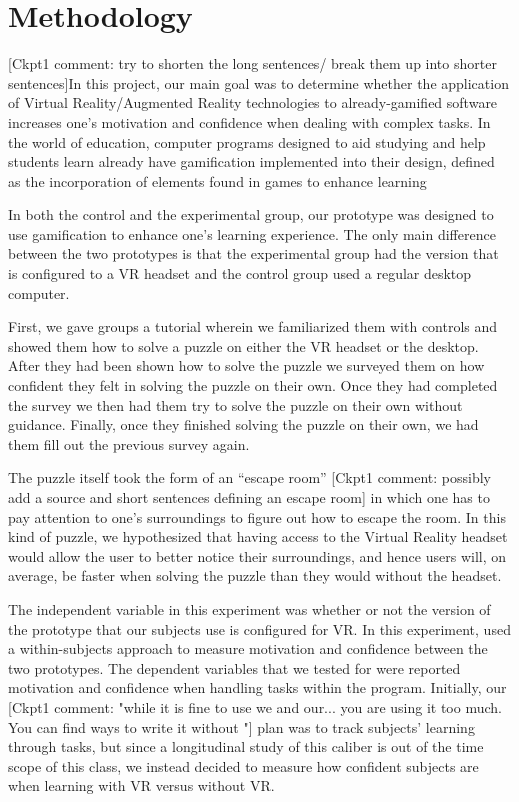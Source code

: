 \documentclass[manuscript,screen,review]{acmart}
\begin{document}
\section{Methodology}
[Ckpt1 comment: try to shorten the long sentences/ break them up into shorter sentences]In this project, our main goal was to determine whether the application of Virtual Reality/Augmented Reality technologies to already-gamified software increases one’s motivation and confidence when dealing with complex tasks. In the world of education, computer programs designed to aid studying and help students learn already have gamification implemented into their design, defined as the incorporation of elements found in games to enhance learning \cite{oberdorfer2021mutual} 

In both the control and the experimental group, our prototype was designed to use gamification to enhance one’s learning experience. The only main difference between the two prototypes is that the experimental group had the version that is configured to a VR headset and the control group used a regular desktop computer. 

First, we gave groups a tutorial wherein we familiarized them with controls and showed them how to solve a puzzle on either the VR headset or the desktop. After they had been shown how to solve the puzzle we surveyed them on how confident they felt in solving the puzzle on their own. Once they had completed the survey we then had them try to solve the puzzle on their own without guidance. Finally, once they finished solving the puzzle on their own, we had them fill out the previous survey again.

The puzzle itself took the form of an “escape room” [Ckpt1 comment: possibly add a source and short sentences defining an escape room] in which one has to pay attention to one’s surroundings to figure out how to escape the room. In this kind of puzzle, we hypothesized that having access to the Virtual Reality headset would allow the user to better notice their surroundings, and hence users will, on average, be faster when solving the puzzle than they would without the headset.

The independent variable in this experiment was whether or not the version of the prototype that our subjects use is configured for VR. In this experiment, used a within-subjects approach to measure motivation and confidence between the two prototypes. The dependent variables that we tested for were reported motivation and confidence when handling tasks within the program. Initially, our [Ckpt1 comment: "while it is fine to use we and our... you are using it too much. You can find ways to write it without "] plan was to track subjects’ learning through tasks, but since a longitudinal study of this caliber is out of the time scope of this class, we instead decided to measure how confident subjects are when learning with VR versus without VR.
\end{document}
